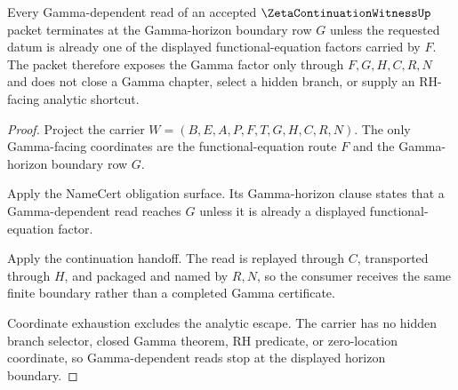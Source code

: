 \begin{theorem}
\label{thm:zeta-continuation-witness-gamma-horizon-consumer-boundary}
Every Gamma-dependent read of an accepted $\ZetaContinuationWitnessUp$ packet terminates at the Gamma-horizon boundary row $G$ unless the requested datum is already one of the displayed functional-equation factors carried by $F$. The packet therefore exposes the Gamma factor only through $F,G,H,C,R,N$ and does not close a Gamma chapter, select a hidden branch, or supply an RH-facing analytic shortcut.
\end{theorem}
\begin{proof}
Project the carrier $W=(B,E,A,P,F,T,G,H,C,R,N)$. The only Gamma-facing coordinates are the functional-equation route $F$ and the Gamma-horizon boundary row $G$.

Apply the NameCert obligation surface. Its Gamma-horizon clause states that a Gamma-dependent read reaches $G$ unless it is already a displayed functional-equation factor.

Apply the continuation handoff. The read is replayed through $C$, transported through $H$, and packaged and named by $R,N$, so the consumer receives the same finite boundary rather than a completed Gamma certificate.

Coordinate exhaustion excludes the analytic escape. The carrier has no hidden branch selector, closed Gamma theorem, RH predicate, or zero-location coordinate, so Gamma-dependent reads stop at the displayed horizon boundary.
\end{proof}
